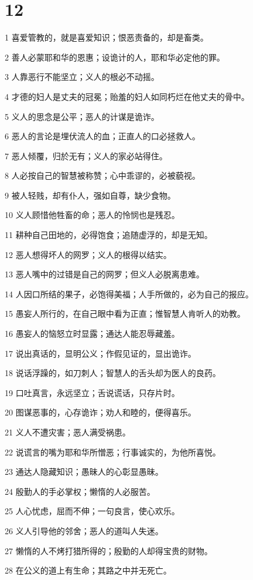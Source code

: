 \chapter{12}

\par 1 喜爱管教的，就是喜爱知识；恨恶责备的，却是畜类。
\par 2 善人必蒙耶和华的恩惠；设诡计的人，耶和华必定他的罪。
\par 3 人靠恶行不能坚立；义人的根必不动摇。
\par 4 才德的妇人是丈夫的冠冕；贻羞的妇人如同朽烂在他丈夫的骨中。
\par 5 义人的思念是公平；恶人的计谋是诡诈。
\par 6 恶人的言论是埋伏流人的血；正直人的口必拯救人。
\par 7 恶人倾覆，归於无有；义人的家必站得住。
\par 8 人必按自己的智慧被称赞；心中乖谬的，必被藐视。
\par 9 被人轻贱，却有仆人，强如自尊，缺少食物。
\par 10 义人顾惜他牲畜的命；恶人的怜悯也是残忍。
\par 11 耕种自己田地的，必得饱食；追随虚浮的，却是无知。
\par 12 恶人想得坏人的网罗；义人的根得以结实。
\par 13 恶人嘴中的过错是自己的网罗；但义人必脱离患难。
\par 14 人因口所结的果子，必饱得美福；人手所做的，必为自己的报应。
\par 15 愚妄人所行的，在自己眼中看为正直；惟智慧人肯听人的劝教。
\par 16 愚妄人的恼怒立时显露；通达人能忍辱藏羞。
\par 17 说出真话的，显明公义；作假见证的，显出诡诈。
\par 18 说话浮躁的，如刀刺人；智慧人的舌头却为医人的良药。
\par 19 口吐真言，永远坚立；舌说谎话，只存片时。
\par 20 图谋恶事的，心存诡诈；劝人和睦的，便得喜乐。
\par 21 义人不遭灾害；恶人满受祸患。
\par 22 说谎言的嘴为耶和华所憎恶；行事诚实的，为他所喜悦。
\par 23 通达人隐藏知识；愚昧人的心彰显愚昧。
\par 24 殷勤人的手必掌权；懒惰的人必服苦。
\par 25 人心忧虑，屈而不伸；一句良言，使心欢乐。
\par 26 义人引导他的邻舍；恶人的道叫人失迷。
\par 27 懒惰的人不烤打猎所得的；殷勤的人却得宝贵的财物。
\par 28 在公义的道上有生命；其路之中并无死亡。

